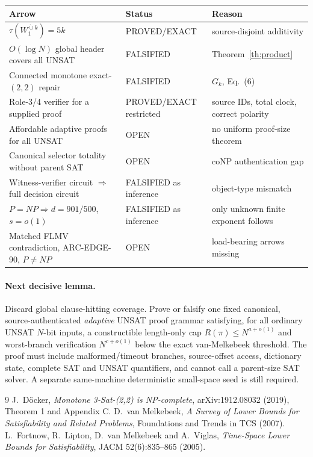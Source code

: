 \documentclass[11pt]{article}
\begin{document}
\begin{center}\begin{tabular}{p{.45\linewidth}p{.2\linewidth}p{.27\linewidth}}
\toprule Arrow & Status & Reason\\\midrule
$\tau(W_1^{\dot\cup k})=5k$ & PROVED/EXACT & source-disjoint additivity\\
$O(\log N)$ global header covers all UNSAT & FALSIFIED & Theorem~\ref{th:product}\\
Connected monotone exact-$(2,2)$ repair & FALSIFIED & $G_k$, Eq.~(6)\\
Role-3/4 verifier for a supplied proof & PROVED/EXACT restricted & source IDs, total clock, correct polarity\\
Affordable adaptive proofs for all UNSAT & OPEN & no uniform proof-size theorem\\
Canonical selector totality without parent SAT & OPEN & coNP authentication gap\\
Witness-verifier circuit $\Rightarrow$ full decision circuit & FALSIFIED as inference & object-type mismatch\\
$P=NP\Rightarrow d=901/500$, $s=o(1)$ & FALSIFIED as inference & only unknown finite exponent follows\\
Matched FLMV contradiction, ARC-EDGE-90, $P\ne NP$ & OPEN & load-bearing arrows missing\\
\bottomrule\end{tabular}\end{center}

\paragraph{Next decisive lemma.}
Discard global clause-hitting coverage.  Prove or falsify one fixed canonical,
source-authenticated \emph{adaptive} UNSAT proof grammar satisfying, for all
ordinary UNSAT $N$-bit inputs, a constructible length-only cap
$R(\pi)\le N^{a+o(1)}$ and worst-branch verification
$N^{c+o(1)}$ below the exact van-Melkebeek threshold.  The proof must include
malformed/timeout branches, source-offset access, dictionary state, complete
SAT and UNSAT quantifiers, and cannot call a parent-size SAT solver.  A
separate same-machine deterministic small-space seed is still required.

\begin{thebibliography}{9}
 J.~D\"ocker, \emph{Monotone 3-Sat-(2,2) is NP-complete},
arXiv:1912.08032 (2019), Theorem 1 and Appendix C.
 D.~van Melkebeek, \emph{A Survey of Lower Bounds for
Satisfiability and Related Problems}, Foundations and Trends in TCS (2007).
 L.~Fortnow, R.~Lipton, D.~van Melkebeek and A.~Viglas,
\emph{Time-Space Lower Bounds for Satisfiability}, JACM 52(6):835--865 (2005).
\end{thebibliography}
\end{document}
